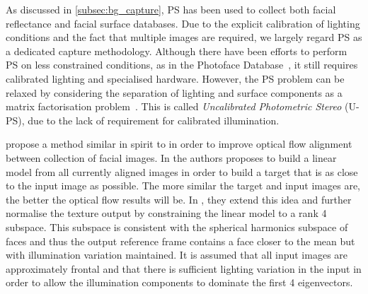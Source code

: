 As discussed in \cref{subsec:bg_capture}, PS has been used to collect both
facial reflectance and facial surface databases. Due to the explicit
calibration of lighting conditions and the fact that multiple images are
required, we largely regard PS as a dedicated capture methodology. Although
there have been efforts to perform PS on less constrained conditions, as in
the Photoface Database~\cite{zafeiriou2013photoface}, it still requires calibrated
lighting and specialised hardware. However, the PS problem can be relaxed by
considering the separation of lighting and surface components as a matrix
factorisation problem~\cite{basri2007photometric,hayakawa1994photometric}.
This is called \textit{Uncalibrated Photometric Stereo} (U-PS),
due to the lack of requirement for calibrated illumination.

\citet{kemelmacher2012collection} propose a method similar in spirit to
\citet{vetter1997bootstrapping} in order to improve optical flow alignment
between collection of facial images. In \citet{vetter1997bootstrapping} the
authors proposes to build a linear model from all currently aligned images in
order to build a target that is as close to the input image as possible. The
more similar the target and input images are, the better the optical flow
results will be. In \citet{kemelmacher2012collection}, they extend this
idea and further normalise the texture output by constraining the linear
model to a rank 4 subspace. This subspace is consistent with the spherical
harmonics subspace of faces and thus the output reference frame contains
a face closer to the mean but with illumination variation maintained. It is
assumed that all input images are approximately frontal and that there is
sufficient lighting variation in the input in order to allow the illumination
components to dominate the first 4 eigenvectors.
